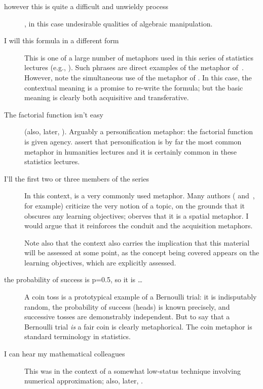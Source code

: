 \begin{description}
\item[however this is quite a difficult and unwieldy process]
  , in this case undesirable qualities of
  algebraic manipulation.
\item[I will  this formula in a different form]
  This is one of a large number of  metaphors used in
  this series of statistics lectures (e.g., ).  Such phrases are
  direct examples of the  metaphor
  of~.  However, note the simultaneous use of the
   metaphor of .  In this
  case, the contextual meaning is a promise to re-write the formula;
  but the basic meaning is clearly both acquisitive and transferative.
\item[The factorial function isn't easy ]{(also, later, ).  Arguably a personification metaphor:
  the factorial function is given agency.   assert that
  personification is by far the most common metaphor in humanities
  lectures and it is certainly common in these statistics lectures.}
\item[I'll  the first two or three members of the
  series]{In this context,  is a very commonly used
  metaphor.  Many authors ( and~,
  for example) criticize the very notion of  a topic,
  on the grounds that it obscures any learning objectives;
   oberves that it is a spatial metaphor.  I
  would argue that it reinforces the conduit and the acquisition
  metaphors.

  Note also that the context also carries the implication that this
  material will be assessed at some point, as the concept being
  covered appears on the learning objectives, which are explicitly
  assessed.}
\item[the probability of success is p=0.5, so it is \ldots] A coin toss is a prototypical example of a Bernoulli
  trial: it is indisputably random, the probability of success (heads)
  is known precisely, and successive tosses are demonstrably
  independent.  But to say that a Bernoulli trial \emph{is} a fair
  coin is clearly metaphorical.  The coin metaphor is standard
  terminology in statistics.
\item[I can hear my mathematical colleagues ]{This was in the context of a somewhat low-status
  technique involving numerical approximation; also, later,
  .

}
\end{description}
